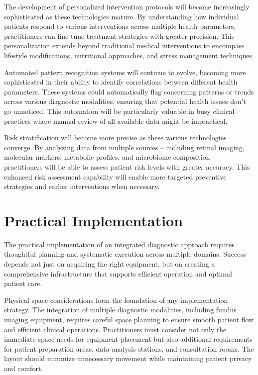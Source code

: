 \documentclass[
  Letterpaper,
]{scrbook}
\begin{document}
The development of personalized intervention protocols will become
increasingly sophisticated as these technologies mature. By
understanding how individual patients respond to various interventions
across multiple health parameters, practitioners can fine-tune treatment
strategies with greater precision. This personalization extends beyond
traditional medical interventions to encompass lifestyle modifications,
nutritional approaches, and stress management techniques.

Automated pattern recognition systems will continue to evolve, becoming
more sophisticated in their ability to identify correlations between
different health parameters. These systems could automatically flag
concerning patterns or trends across various diagnostic modalities,
ensuring that potential health issues don't go unnoticed. This
automation will be particularly valuable in busy clinical practices
where manual review of all available data might be impractical.

Risk stratification will become more precise as these various
technologies converge. By analyzing data from multiple sources --
including retinal imaging, molecular markers, metabolic profiles, and
microbiome composition -- practitioners will be able to assess patient
risk levels with greater accuracy. This enhanced risk assessment
capability will enable more targeted preventive strategies and earlier
interventions when necessary.

\section{Practical Implementation}\label{practical-implementation-1}

The practical implementation of an integrated diagnostic approach
requires thoughtful planning and systematic execution across multiple
domains. Success depends not just on acquiring the right equipment, but
on creating a comprehensive infrastructure that supports efficient
operation and optimal patient care.

Physical space considerations form the foundation of any implementation
strategy. The integration of multiple diagnostic modalities, including
fundus imaging equipment, requires careful space planning to ensure
smooth patient flow and efficient clinical operations. Practitioners
must consider not only the immediate space needs for equipment placement
but also additional requirements for patient preparation areas, data
analysis stations, and consultation rooms. The layout should minimize
unnecessary movement while maintaining patient privacy and comfort.
\end{document}
